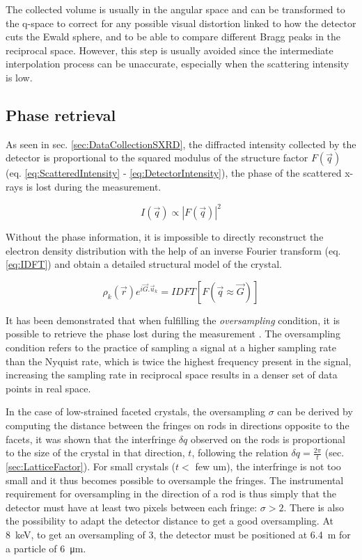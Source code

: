 The collected volume is usually in the angular space and can be transformed to the q-space to correct for any possible visual distortion linked to how the detector cuts the Ewald sphere, and to be able to compare different Bragg peaks in the reciprocal space.
However, this step is usually avoided since the intermediate interpolation process can be unaccurate, especially when the scattering intensity is low.

\subsection{Phase retrieval}\label{sec:PhaseRetrieval}

As seen in sec. \ref{sec:DataCollectionSXRD}, the diffracted intensity collected by the detector is proportional to the squared modulus of the structure factor $F(\vec{q})$ (eq. \ref{eq:ScatteredIntensity} - \ref{eq:DetectorIntensity}), the phase of the scattered x-rays is lost during the measurement.

\begin{equation}
    \label{eq:DetectorIntensity}
    I(\vec{q}) \propto |F(\vec{q})|^2
\end{equation}

Without the phase information, it is impossible to directly reconstruct the electron density distribution with the help of an inverse Fourier transform (eq. \ref{eq:IDFT}) and obtain a detailed structural model of the crystal.

\begin{equation}
    \label{eq:IDFT}
    \rho_k(\vec{r}) e^{i\vec{G}.\vec{u}_k} = IDFT [F(\vec{q} \approx \vec{G})]
\end{equation}

It has been demonstrated that when fulfilling the \textit{oversampling} condition, it is possible to retrieve the phase lost during the measurement \parencite{Shannon1949, sayre_implications_1952}.
The oversampling condition refers to the practice of sampling a signal at a higher sampling rate than the Nyquist rate, which is twice the highest frequency present in the signal, increasing the sampling rate in reciprocal space results in a denser set of data points in real space.

In the case of low-strained faceted crystals, the oversampling $\sigma$ can be derived by computing the distance between the fringes on rods in directions opposite to the facets, it was shown that the interfringe $\delta q$ observed on the rods is proportional to the size of the crystal in that direction, $t$, following the relation $\delta q = \frac{2\pi}{t}$ (sec. \ref{sec:LatticeFactor}).
For small crystals ($t<$ few \unit{um}), the interfringe is not too small and it thus becomes possible to oversample the fringes.
The instrumental requirement for oversampling in the direction of a rod is thus simply that the detector must have at least two pixels between each fringe: $\sigma >2$.
There is also the possibility to adapt the detector distance to get a good oversampling.
At \qty{8}{\keV}, to get an oversampling of 3, the detector must be positioned at \qty{6.4}{\m} for a particle of \qty{6}{\um}.

